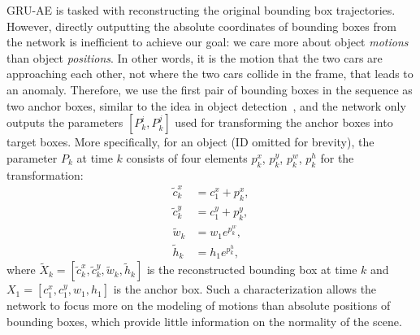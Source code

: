 GRU-AE is tasked with reconstructing the original bounding box trajectories. However, directly outputting the absolute coordinates of bounding boxes from the network is inefficient to achieve our goal: we care more about object \textit{motions} than object \textit{positions}. In other words, it is the motion that the two cars are approaching each other, not where the two cars collide in the frame, that leads to an anomaly. Therefore, we use the first pair of bounding boxes in the sequence as two anchor boxes, similar to the idea in object detection~\citep{redmon2018yolov3}, and the network only outputs the parameters $[P_k^i, P_k^j]$ used for transforming the anchor boxes into target boxes. More specifically, for an object (ID omitted for brevity), the parameter $P_k$ at time $k$ consists of four elements $p_k^x$, $p_k^y$, $p_k^w$, $p_k^h$ for the transformation:
\begin{equation}
\label{eq:new-box-from-anchor-box}
\begin{aligned}
\tilde{c}_k^x &= c_1^x + p_k^x, \\
\tilde{c}_k^y &= c_1^y + p_k^y, \\
\tilde{w}_k &= w_1 e^{p_k^w}, \\
\tilde{h}_k &= h_1 e^{p_k^h},
\end{aligned}
\end{equation}
where $\tilde{X}_k=[\tilde{c}_k^x, \tilde{c}_k^y, \tilde{w}_k, \tilde{h}_k]$ is the reconstructed bounding box at time $k$ and $X_1=[c_1^x, c_1^y, w_1, h_1]$ is the anchor box. Such a characterization allows the network to focus more on the modeling of motions than absolute positions of bounding boxes, which provide little information on the normality of the scene.

